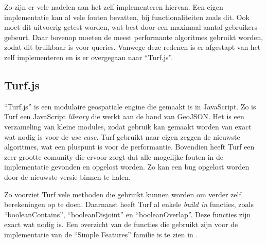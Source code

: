 Zo zijn er vele nadelen aan het zelf implementeren hiervan. Een eigen implementatie kan al vele fouten bevatten, bij functionaliteiten zoals dit. Ook moet dit uitvoerig getest worden, wat best door een maximaal aantal gebruikers gebeurt. Daar bovenop moeten de meest performante algoritmes gebruikt worden, zodat dit bruikbaar is voor queries. Vanwege deze redenen is er afgestapt van het zelf implementeren en is er overgegaan naar ``Turf.js''.

\subsection{Turf.js}
``Turf.js'' is een modulaire geospatiale engine die gemaakt is in JavaScript. Zo is Turf een JavaScript \textit{library} die werkt aan de hand van GeoJSON. Het is een verzameling van kleine modules, zodat gebruik kan gemaakt worden van exact wat nodig is voor de \textit{use case}. Turf gebruikt naar eigen zeggen de nieuwste algoritmes, wat een pluspunt is voor de performantie. Bovendien heeft Turf een zeer grootte comunity die ervoor zorgt dat alle mogelijke fouten in de implementatie gevonden en opgelost worden. Zo kan een bug opgelost worden door de nieuwste versie binnen te halen.

Zo voorziet Turf vele methoden die gebruikt kunnen worden om verder zelf berekeningen op te doen. Daarnaast heeft Turf al enkele \textit{build in} functies, zoals ``booleanContains'', ``booleanDisjoint'' en ``booleanOverlap''. Deze functies zijn exact wat nodig is. Een overzicht van de functies die gebruikt zijn voor de implementatie van de ``Simple Features'' familie is te zien in .

